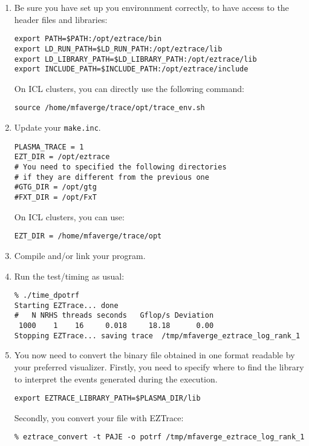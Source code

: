 \begin{enumerate}
\item Be sure you have set up you environnment correctly, to have
  access to the header files and libraries:
\begin{verbatim}
export PATH=$PATH:/opt/eztrace/bin
export LD_RUN_PATH=$LD_RUN_PATH:/opt/eztrace/lib
export LD_LIBRARY_PATH=$LD_LIBRARY_PATH:/opt/eztrace/lib
export INCLUDE_PATH=$INCLUDE_PATH:/opt/eztrace/include
\end{verbatim}

On ICL clusters, you can directly use the following command:
\begin{verbatim}
source /home/mfaverge/trace/opt/trace_env.sh
\end{verbatim}

\item Update your \texttt{make.inc}. 

\begin{verbatim}
PLASMA_TRACE = 1
EZT_DIR = /opt/eztrace
# You need to specified the following directories 
# if they are different from the previous one
#GTG_DIR = /opt/gtg  
#FXT_DIR = /opt/FxT
\end{verbatim}

On ICL clusters, you can use:
\begin{verbatim}
EZT_DIR = /home/mfaverge/trace/opt
\end{verbatim}

\item Compile and/or link your program.

\item Run the test/timing as usual:
\begin{verbatim}
% ./time_dpotrf
Starting EZTrace... done
#   N NRHS threads seconds   Gflop/s Deviation
 1000    1    16     0.018     18.18      0.00
Stopping EZTrace... saving trace  /tmp/mfaverge_eztrace_log_rank_1
\end{verbatim}

\item You now need to convert the binary file obtained in one format
  readable by your preferred visualizer. Firstly, you need to specify
  where to find the library to interpret the events generated during
  the execution.
\begin{verbatim}
export EZTRACE_LIBRARY_PATH=$PLASMA_DIR/lib
\end{verbatim}

Secondly, you convert your file with EZTrace:
\begin{verbatim}
% eztrace_convert -t PAJE -o potrf /tmp/mfaverge_eztrace_log_rank_1
\end{verbatim}

\end{enumerate}


